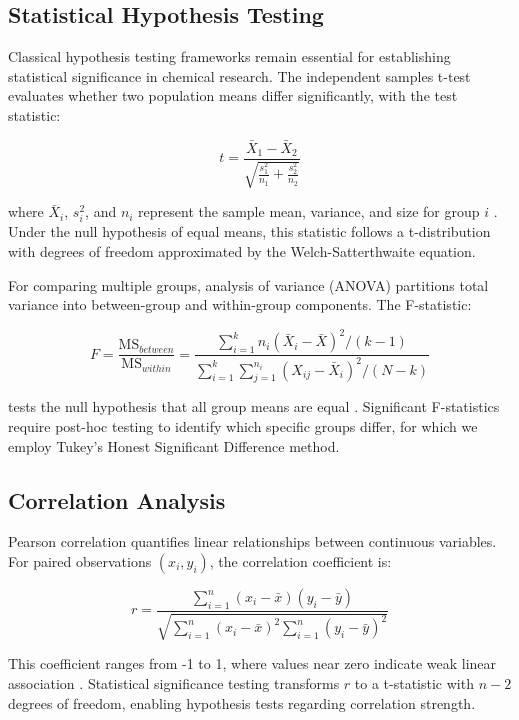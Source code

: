 \documentclass[conference]{IEEEtran}
\begin{document}
\subsection{Statistical Hypothesis Testing}

Classical hypothesis testing frameworks remain essential for establishing statistical significance in chemical research. The independent samples t-test evaluates whether two population means differ significantly, with the test statistic:

\begin{equation}
t = \frac{\bar{X}_1 - \bar{X}_2}{\sqrt{\frac{s_1^2}{n_1} + \frac{s_2^2}{n_2}}}
\end{equation}

where $\bar{X}_i$, $s_i^2$, and $n_i$ represent the sample mean, variance, and size for group $i$ \cite{student1908probable}. Under the null hypothesis of equal means, this statistic follows a t-distribution with degrees of freedom approximated by the Welch-Satterthwaite equation.

For comparing multiple groups, analysis of variance (ANOVA) partitions total variance into between-group and within-group components. The F-statistic:

\begin{equation}
F = \frac{\text{MS}_{between}}{\text{MS}_{within}} = \frac{\sum_{i=1}^{k} n_i(\bar{X}_i - \bar{X})^2 / (k-1)}{\sum_{i=1}^{k}\sum_{j=1}^{n_i}(X_{ij} - \bar{X}_i)^2 / (N-k)}
\end{equation}

tests the null hypothesis that all group means are equal \cite{fisher1925statistical}. Significant F-statistics require post-hoc testing to identify which specific groups differ, for which we employ Tukey's Honest Significant Difference method.

\subsection{Correlation Analysis}

Pearson correlation quantifies linear relationships between continuous variables. For paired observations $(x_i, y_i)$, the correlation coefficient is:

\begin{equation}
r = \frac{\sum_{i=1}^{n}(x_i - \bar{x})(y_i - \bar{y})}{\sqrt{\sum_{i=1}^{n}(x_i - \bar{x})^2 \sum_{i=1}^{n}(y_i - \bar{y})^2}}
\end{equation}

This coefficient ranges from -1 to 1, where values near zero indicate weak linear association \cite{pearson1895correlation}. Statistical significance testing transforms $r$ to a t-statistic with $n-2$ degrees of freedom, enabling hypothesis tests regarding correlation strength.
\end{document}
